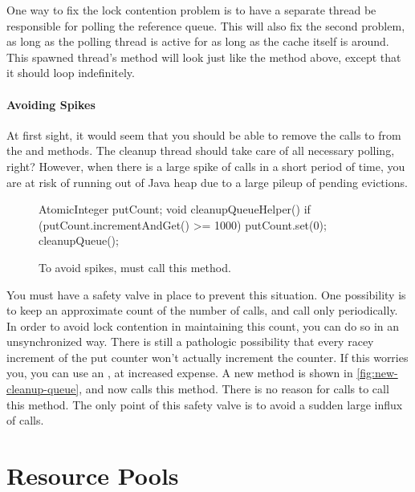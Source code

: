 One way to fix the lock contention problem is to have a separate thread be
responsible for polling the reference queue. This will also fix the second
problem, as long as the polling thread is active for as long as the cache itself
is around. This spawned thread's  method will look just like the
 method above, except that it should loop indefinitely.

\paragraph{Avoiding Spikes}
At first sight, it would seem that you should be able to remove the calls to
 from the  and  methods. The cleanup
thread should take care of all necessary polling, right? However, when there is
a large spike of  calls in a short period of time, you are at risk of
running out of Java heap due to a large pileup of pending evictions.

\begin{wrapfigure}{r}{0.4\textwidth}
\centering
\begin{framedlisting}
AtomicInteger putCount;
void cleanupQueueHelper() {
  if (putCount.incrementAndGet() >= 1000) {
    putCount.set(0);
    cleanupQueue();
  }
}
\end{framedlisting}
\caption{To avoid spikes,  must call this method.}
\label{fig:new-cleanup-queue}
\end{wrapfigure}
You must have a safety valve in place to prevent this situation. One possibility
is to keep an approximate count of the number of  calls, and call
 only periodically. In order to avoid lock contention in
maintaining this count, you can do so in an unsynchronized way. There is still a
pathologic possibility that every racey increment of the put counter won't
actually increment the counter. If this worries you, you can use an
, at increased expense. A new 
method is shown in \autoref{fig:new-cleanup-queue}, and  now calls
this method. There is no reason for  calls to call this method. The
only point of this safety valve is to avoid a sudden large influx of  calls.



\section{Resource Pools}
\label{sec:resource-pools}

